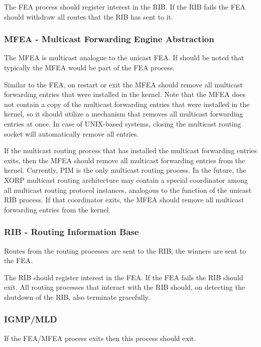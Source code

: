 \documentclass[11pt]{article}
\begin{document}
The FEA process should register interest in the RIB. If the RIB fails
the FEA should withdraw all routes that the RIB has sent to it.

\subsubsection{MFEA - Multicast Forwarding Engine Abstraction}

The MFEA is multicast analogue to the unicast FEA. If should be noted
that typically the MFEA would be part of the FEA process.

Similar to the FEA, on restart or exit the MFEA should remove all
multicast forwarding entries that were installed in the kernel. Note
that the MFEA does not contain a copy of the multicast forwarding entries
that were installed in the kernel, so it should utilize a
mechanism that removes all multicast forwarding entries at once.  In
case of UNIX-based systems, closing the multicast routing socket will
automatically remove all entries.

If the multicast routing process that has installed the multicast
forwarding entries exits, then the MFEA should remove all multicast
forwarding entries from the kernel. Currently, PIM is the only
multicast routing process. In the future, the XORP multicast routing
architecture may contain a special coordinator among all multicast
routing protocol instances, analogous to the function of the unicast
RIB process. If that coordinator exits, the MFEA should remove all
multicast forwarding entries from the kernel.

\subsubsection{RIB - Routing Information Base}

Routes from the routing processes are sent to the RIB; the winners are
sent to the FEA.

The RIB should register interest in the FEA. If the FEA fails the RIB
should exit. All routing processes that interact with the RIB should,
on detecting the shutdown of the RIB, also terminate gracefully.

\subsubsection{IGMP/MLD}

If the FEA/MFEA process exits then this process should exit.
\end{document}
